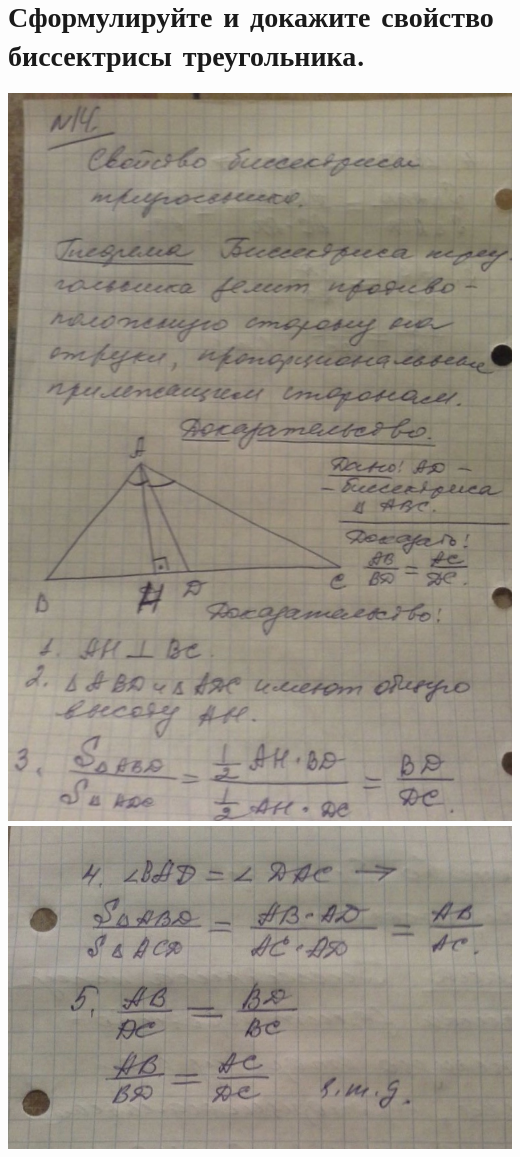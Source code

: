 \documentclass[12pt, letterpaper]{article}
\begin{document}
\section {Сформулируйте и докажите свойство биссектрисы треугольника.}
\includegraphics[scale=0.3]{solve14.jpg} \\
\includegraphics[scale=0.3]{solve14-1.jpg} \\
\end{document}
